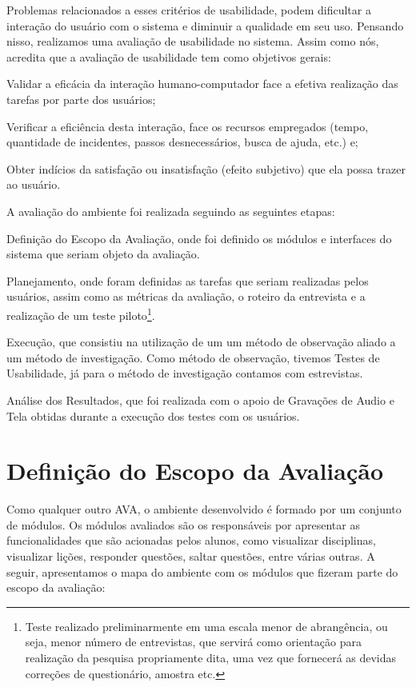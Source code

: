 Problemas relacionados a esses crit\'erios de usabilidade, podem dificultar a intera\c{c}\~ao do usu\'ario com o sistema e diminuir a 
qualidade em seu uso. Pensando nisso, realizamos uma avalia\c{c}\~ao de usabilidade no sistema. Assim como n\'os,  acredita que a avalia\c{c}\~ao de usabilidade tem como objetivos gerais:

\begin{alineascomponto}
	\item Validar a eficácia da interação humano-computador face a efetiva realização das tarefas por parte dos usuários;
	\item Verificar a eficiência desta interação, face os recursos empregados (tempo, quantidade de incidentes, passos desnecessários, 
busca de ajuda, etc.) e;
	\item Obter indícios da satisfação ou insatisfação (efeito subjetivo) que ela possa trazer ao usuário.
\end{alineascomponto}

A avaliação do ambiente foi realizada seguindo as seguintes etapas:

\begin{alineascomnumero}
	\item Definição do Escopo da Avaliação, onde foi definido os módulos e interfaces do sistema que seriam objeto da avaliação.
	\item Planejamento, onde foram definidas as tarefas que seriam realizadas pelos usuários, assim como as métricas da avaliação, o roteiro da entrevista e a realização de um teste piloto\footnote{Teste realizado preliminarmente em uma escala menor de abrangência, ou seja, menor número de entrevistas, que servirá como orientação para realização da pesquisa propriamente dita, uma vez que fornecerá as devidas correções de questionário, amostra etc.}. 
	\item Execução, que consistiu na utilização de um um método de observação aliado a um método de investigação. Como método de observação, tivemos Testes de Usabilidade, já para o método de investigação contamos com estrevistas.
	\item An\'alise dos Resultados, que foi realizada com o apoio de Gravações de Audio e Tela obtidas durante a execução dos testes com os usuários.
\end{alineascomnumero}

\section{Definição do Escopo da Avalia\c{c}\~ao}
Como qualquer outro AVA, o ambiente desenvolvido é formado por um conjunto de módulos. Os módulos avaliados são os responsáveis por apresentar as funcionalidades que são acionadas pelos alunos, como visualizar disciplinas, visualizar lições, responder questões, saltar questões, entre várias outras. A seguir, apresentamos o mapa do ambiente com os módulos que fizeram parte do escopo da avaliação:

